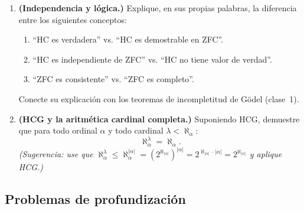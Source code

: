 \begin{enumerate}[leftmargin=2em, label=\textbf{P\arabic*.}]
  \item \textbf{(Independencia y lógica.)} Explique, en sus propias palabras, la diferencia entre los siguientes conceptos:
  \begin{enumerate}[label=(\alph*)]
    \item ``HC es verdadera'' vs. ``HC es demostrable en ZFC''.
    \item ``HC es independiente de ZFC'' vs. ``HC no tiene valor de verdad''.
    \item ``ZFC es consistente'' vs. ``ZFC es completo''.
  \end{enumerate}
  Conecte su explicación con los teoremas de incompletitud de Gödel (clase~1).

  \item \textbf{(HCG y la aritmética cardinal completa.)} Suponiendo HCG, demuestre que para todo ordinal $\alpha$ y todo cardinal $\lambda < \aleph_\alpha$:
  \[
    \aleph_\alpha^\lambda = \aleph_\alpha.
  \]
  \textit{(Sugerencia: use que $\aleph_\alpha^\lambda \leq \aleph_\alpha^{|\alpha|} = (2^{\aleph_{|\alpha|}})^{|\alpha|} = 2^{\aleph_{|\alpha|} \cdot |\alpha|} = 2^{\aleph_{|\alpha|}}$ y aplique HCG.)}

\end{enumerate}

\subsection*{Problemas de profundización}

